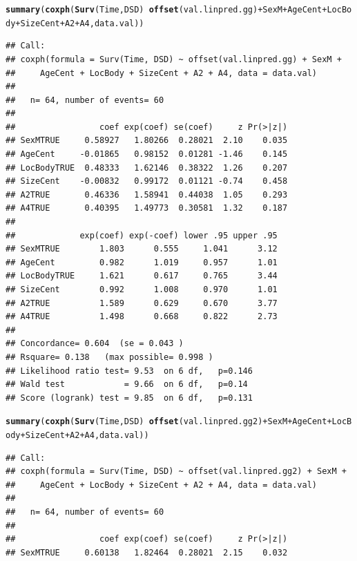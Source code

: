 \documentclass{article}\usepackage[]{graphicx}\usepackage[]{color}
\makeatletter
\newcommand{\hlopt}[1]{\textcolor[rgb]{0,0,0}{#1}}%
\newcommand{\hlstd}[1]{\textcolor[rgb]{0.345,0.345,0.345}{#1}}%
\newcommand{\hlkwd}[1]{\textcolor[rgb]{0.737,0.353,0.396}{\textbf{#1}}}%
\newenvironment{kframe}{%
 \def\at@end@of@kframe{}%
 \ifinner\ifhmode%
  \def\at@end@of@kframe{\end{minipage}}%
  \begin{minipage}{\columnwidth}%
 \fi\fi%
 \def\FrameCommand##1{\hskip\@totalleftmargin \hskip-\fboxsep
 \colorbox{shadecolor}{##1}\hskip-\fboxsep
     \hskip-\linewidth \hskip-\@totalleftmargin \hskip\columnwidth}%
 \MakeFramed {\advance\hsize-\width
   \@totalleftmargin\z@ \linewidth\hsize
   \@setminipage}}%
 {\par\unskip\endMakeFramed%
 \at@end@of@kframe}
\newenvironment{knitrout}{}{} %
\makeatother
\begin{document}
\begin{knitrout}
\begin{kframe}
{\ttfamily\noindent\bfseries\color{errorcolor}{\#\# Error in fitter(X, Y, strats, offset, init, control, weights = weights, : NA/NaN/Inf in foreign function call (arg 6)}}\begin{alltt}
\hlkwd{summary}\hlstd{(}\hlkwd{coxph}\hlstd{(}\hlkwd{Surv}\hlstd{(Time, DSD)} \hlopt{~} \hlkwd{offset}\hlstd{(val.linpred.gg)} \hlopt{+} \hlstd{SexM} \hlopt{+} \hlstd{AgeCent} \hlopt{+} \hlstd{LocBody} \hlopt{+} \hlstd{SizeCent} \hlopt{+} \hlstd{A2} \hlopt{+} \hlstd{A4, data.val))}
\end{alltt}
\begin{verbatim}
## Call:
## coxph(formula = Surv(Time, DSD) ~ offset(val.linpred.gg) + SexM + 
##     AgeCent + LocBody + SizeCent + A2 + A4, data = data.val)
## 
##   n= 64, number of events= 60 
## 
##                 coef exp(coef) se(coef)     z Pr(>|z|)
## SexMTRUE     0.58927   1.80266  0.28021  2.10    0.035
## AgeCent     -0.01865   0.98152  0.01281 -1.46    0.145
## LocBodyTRUE  0.48333   1.62146  0.38322  1.26    0.207
## SizeCent    -0.00832   0.99172  0.01121 -0.74    0.458
## A2TRUE       0.46336   1.58941  0.44038  1.05    0.293
## A4TRUE       0.40395   1.49773  0.30581  1.32    0.187
## 
##             exp(coef) exp(-coef) lower .95 upper .95
## SexMTRUE        1.803      0.555     1.041      3.12
## AgeCent         0.982      1.019     0.957      1.01
## LocBodyTRUE     1.621      0.617     0.765      3.44
## SizeCent        0.992      1.008     0.970      1.01
## A2TRUE          1.589      0.629     0.670      3.77
## A4TRUE          1.498      0.668     0.822      2.73
## 
## Concordance= 0.604  (se = 0.043 )
## Rsquare= 0.138   (max possible= 0.998 )
## Likelihood ratio test= 9.53  on 6 df,   p=0.146
## Wald test            = 9.66  on 6 df,   p=0.14
## Score (logrank) test = 9.85  on 6 df,   p=0.131
\end{verbatim}
\begin{alltt}
\hlkwd{summary}\hlstd{(}\hlkwd{coxph}\hlstd{(}\hlkwd{Surv}\hlstd{(Time, DSD)} \hlopt{~} \hlkwd{offset}\hlstd{(val.linpred.gg2)} \hlopt{+} \hlstd{SexM} \hlopt{+} \hlstd{AgeCent} \hlopt{+} \hlstd{LocBody} \hlopt{+} \hlstd{SizeCent} \hlopt{+} \hlstd{A2} \hlopt{+} \hlstd{A4, data.val))}
\end{alltt}
\begin{verbatim}
## Call:
## coxph(formula = Surv(Time, DSD) ~ offset(val.linpred.gg2) + SexM + 
##     AgeCent + LocBody + SizeCent + A2 + A4, data = data.val)
## 
##   n= 64, number of events= 60 
## 
##                 coef exp(coef) se(coef)     z Pr(>|z|)
## SexMTRUE     0.60138   1.82464  0.28021  2.15    0.032

\end{verbatim}
\end{kframe}
\end{knitrout}
\end{document}
